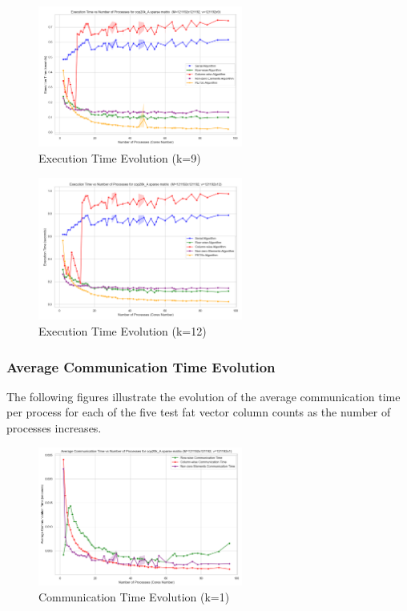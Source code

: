 \documentclass[12pt,oneside]{book} %
\begin{document}
\begin{figure}[H]
    \centering
    \includegraphics[width=0.6\textwidth]{../results/fat_vector_dim/cop20k_A_k9_execution_time.png}
    \caption{Execution Time Evolution (k=9)}\label{fig:cop20k-a-k9-execution-time}
\end{figure}

\begin{figure}[H]
    \centering
    \includegraphics[width=0.6\textwidth]{../results/fat_vector_dim/cop20k_A_k12_execution_time.png}
    \caption{Execution Time Evolution (k=12)}\label{fig:cop20k-a-k12-execution-time}
\end{figure}

\subsubsection{Average Communication Time Evolution}

The following figures illustrate the evolution of the average communication
time per process for each of the five test fat vector column counts as the
number of processes increases.

\begin{figure}[H]
    \centering
    \includegraphics[width=0.6\textwidth]{../results/fat_vector_dim/cop20k_A_k1_communication_time.png}
    \caption{Communication Time Evolution (k=1)}\label{fig:cop20k-a-k1-communication-time}
\end{figure}
\end{document}
